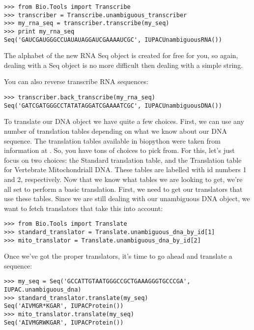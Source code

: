 \documentclass[dvips]{article}
\begin{document}
\begin{verbatim}
>>> from Bio.Tools import Transcribe
>>> transcriber = Transcribe.unambiguous_transcriber
>>> my_rna_seq = transcriber.transcribe(my_seq)
>>> print my_rna_seq
Seq('GAUCGAUGGGCCUAUAUAGGAUCGAAAAUCGC', IUPACUnambiguousRNA())
\end{verbatim}

The alphabet of the new RNA Seq object is created for free for you, so again, dealing with a Seq object is no more difficult then dealing with a simple string.


You can also reverse transcribe RNA sequences:

\begin{verbatim}
>>> transcriber.back_transcribe(my_rna_seq)
Seq('GATCGATGGGCCTATATAGGATCGAAAATCGC', IUPACUnambiguousDNA())
\end{verbatim}


To translate our DNA object we have quite a few choices. First, we can use any number of translation tables depending on what we know about our DNA sequence. The translation tables available in biopython were taken from information at . So, you have tons of choices to pick from. For this, let's just focus on two choices: the Standard translation table, and the Translation table for Vertebrate Mitochondriall DNA. These tables are labelled with id numbers 1 and 2, respectively. Now that we know what tables we are looking to get, we're all set to perform a basic translation. First, we need to get our translators that use these tables. Since we are still dealing with our unambiguous DNA object, we want to fetch translators that take this into account:

\begin{verbatim}
>>> from Bio.Tools import Translate
>>> standard_translator = Translate.unambiguous_dna_by_id[1] 
>>> mito_translator = Translate.unambiguous_dna_by_id[2]
\end{verbatim}

Once we've got the proper translators, it's time to go ahead and translate a sequence:

\begin{verbatim}
>>> my_seq = Seq('GCCATTGTAATGGGCCGCTGAAAGGGTGCCCGA', IUPAC.unambiguous_dna)
>>> standard_translator.translate(my_seq)
Seq('AIVMGR*KGAR', IUPACProtein())
>>> mito_translator.translate(my_seq)
Seq('AIVMGRWKGAR', IUPACProtein())
\end{verbatim}
\end{document}
